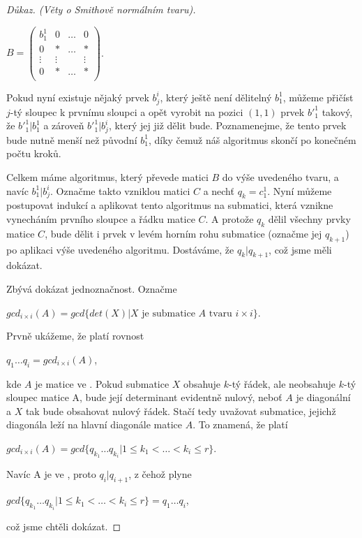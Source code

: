 \begin{proof}[Důkaz. (Věty o Smithově normálním tvaru)]
\begin{center}
$ B =
    \begin{pmatrix}
        b_1^1   & 0      & \hdots & 0       \\
        0       & \ast   & \hdots & \ast    \\
        \vdots  & \vdots &        & \vdots   \\
        0       & \ast   & \hdots & \ast    \\
    \end{pmatrix}
$.
\end{center}


Pokud nyní existuje nějaký prvek $ b_j^i $, který ještě není dělitelný $ b_1^1 $, můžeme
přičíst $j$-tý sloupec k prvnímu sloupci a opět vyrobit na pozici $ (1, 1) $ prvek $ {b'}_{1}^{1} $
takový, že $ {b'}_{1}^{1} \vert b_1^1 $ a zároveň $ {b'}_{1}^{1} \vert b_j^i $,
který jej již dělit bude. Poznamenejme, že tento prvek bude nutně menší než původní
$ b_1^1 $, díky čemuž náš algoritmus skončí po konečném počtu kroků.

Celkem máme algoritmus, který převede matici $B$ do výše uvedeného tvaru,
a navíc $ {b}_{1}^{1} \vert b_j^i $.
Označme takto vzniklou matici $ C $ a nechť $ q_k = c_1^1 $.
Nyní můžeme postupovat indukcí a aplikovat tento algoritmus
na submatici, která vznikne vynecháním prvního sloupce a řádku matice $C$.
A protože $ q_k $ dělil všechny prvky matice $C$, bude dělit i prvek v levém
horním rohu submatice (označme jej $ q_{k+1} $) po aplikaci výše uvedeného algoritmu.
Dostáváme, že $ q_k \vert q_{k+1}$, což jsme měli dokázat.

Zbývá dokázat jednoznačnost. Označme
\begin{center}
$ gcd_{i \times i }(A) = gcd\{det(X) \vert X \textrm{ je submatice } A \textrm{ tvaru }i \times i\} $.
\end{center}

Prvně ukážeme, že platí rovnost
\begin{center}
$ q_1 \hdots q_i = gcd_{i \times i }(A)$,
\end{center}

kde $ A $ je matice ve \snf{}. Pokud submatice $ X $ obsahuje $k$-tý řádek, ale
neobsahuje $k$-tý sloupec matice A, bude její determinant evidentně nulový,
neboť $ A $ je diagonální a $ X $ tak bude obsahovat nulový řádek. Stačí tedy
uvažovat submatice, jejichž diagonála leží na hlavní diagonále matice $ A $. To
znamená, že platí
\begin{center}
$ gcd_{i \times i }(A) = gcd\{q_{k_1} \hdots q_{k_i} \vert 1 \leq k_1 < \hdots < k_i \leq r \} $.
\end{center}
Navíc A je ve \snf{}, proto $ q_i | q_{i+1} $, z čehož plyne
\begin{center}
$ gcd\{q_{k_1} \hdots q_{k_i} \vert 1 \leq k_1 < \hdots < k_i \leq r \} = q_1 \hdots q_i $,
\end{center}
což jsme chtěli dokázat.


\end{proof}
